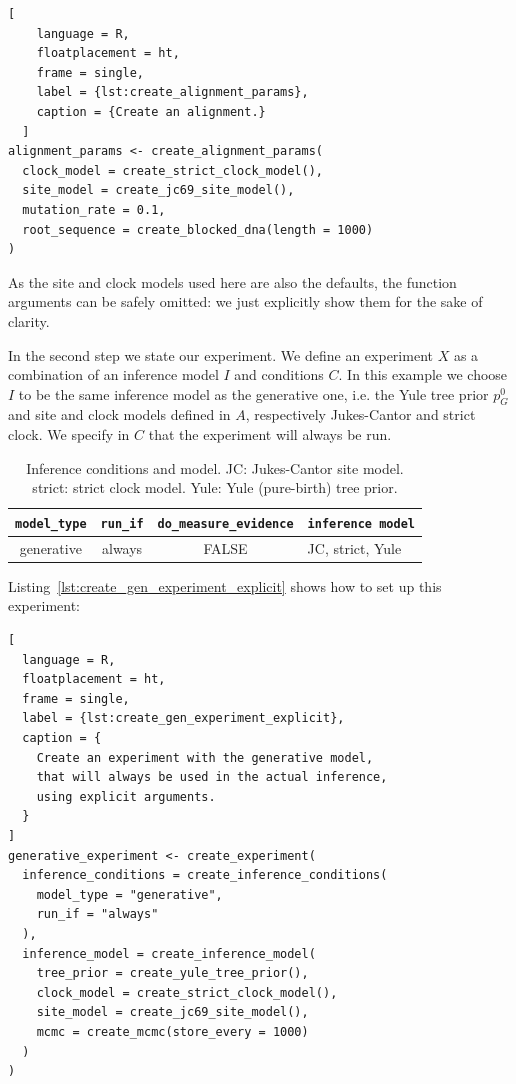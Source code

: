\begin{lstlisting}[
    language = R,
    floatplacement = ht,
    frame = single,
    label = {lst:create_alignment_params}, 
    caption = {Create an alignment.}
  ]
alignment_params <- create_alignment_params(
  clock_model = create_strict_clock_model(),
  site_model = create_jc69_site_model(),
  mutation_rate = 0.1,
  root_sequence = create_blocked_dna(length = 1000)
)
\end{lstlisting}

As the site and clock models used here are also the defaults, 
the function arguments can be safely omitted: we just explicitly show 
them for the sake of clarity.

In the second step we state our experiment.
We define an experiment $\mathit{X}$ as a combination of an inference model 
$\mathit{I}$ and conditions $\mathit{C}$.
In this example we choose $\mathit{I}$ to be the same inference model as 
the generative one,
i.e. the Yule tree prior $\mathit{p_{G}^0}$ and site 
and clock models defined in $\mathit{A}$, 
respectively Jukes-Cantor and strict clock.
We specify in $\mathit{C}$ that the experiment will always be run.

\begin{table}
  \begin{tabular}{ | c | c | c | l | }
    \hline
    \texttt{model\_type} &
    \texttt{run\_if} &
    \texttt{do\_measure\_evidence} & 
    \texttt{inference model} \\ 
    \hline
    generative &
    always &
    FALSE &
    JC, strict, Yule \\
    \hline
  \end{tabular}
  \caption{
    Inference conditions and model.
    JC: Jukes-Cantor site model.
    strict: strict clock model.
    Yule: Yule (pure-birth) tree prior.
  }
  \label{tab:RQ1}
\end{table}

Listing~\ref{lst:create_gen_experiment_explicit} shows how to
set up this experiment:

\begin{lstlisting}[
  language = R,
  floatplacement = ht,
  frame = single,
  label = {lst:create_gen_experiment_explicit},
  caption = {
    Create an experiment with the generative model,
    that will always be used in the actual inference, 
    using explicit arguments.
  }
]
generative_experiment <- create_experiment(
  inference_conditions = create_inference_conditions(
    model_type = "generative", 
    run_if = "always"
  ), 
  inference_model = create_inference_model(
    tree_prior = create_yule_tree_prior(),
    clock_model = create_strict_clock_model(), 
    site_model = create_jc69_site_model(),
    mcmc = create_mcmc(store_every = 1000)
  )
)
\end{lstlisting}

